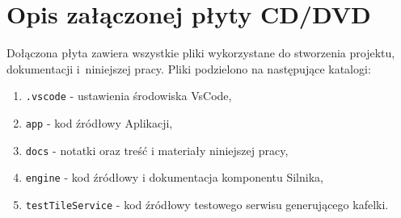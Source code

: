 \chapter{Opis załączonej płyty CD/DVD}
Dołączona płyta zawiera wszystkie pliki wykorzystane do stworzenia projektu, dokumentacji i~niniejszej pracy. Pliki podzielono na następujące katalogi:

\begin{enumerate}
    \item \texttt{.vscode} - ustawienia środowiska VsCode,
    \item \texttt{app} - kod źródłowy Aplikacji,
    \item \texttt{docs} - notatki oraz treść i materiały niniejszej pracy,
    \item \texttt{engine} - kod źródłowy i dokumentacja komponentu Silnika,    \item \texttt{testTileService} - kod źródłowy testowego serwisu generującego kafelki.
\end{enumerate}
